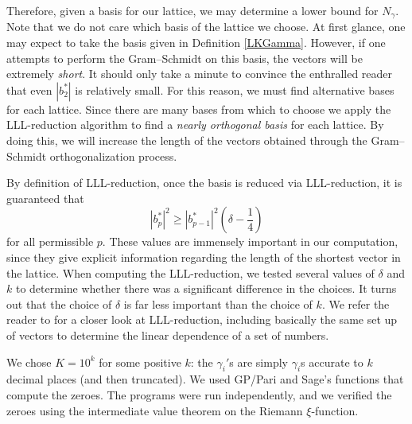 \documentclass{article}
\numberwithin{equation}{section}
\begin{document}
Therefore, given a basis for our lattice, we may determine a lower bound for  $N_{\gamma}$. Note that we do not care which basis of the lattice we choose. At first glance, one may expect to take the basis given in Definition \ref{LKGamma}. However, if one attempts to perform the Gram--Schmidt on this basis, the vectors will be extremely {\it short}. It should only take a minute to convince the enthralled reader that even $|b_2^*|$ is relatively small. For this reason, we must find alternative bases for each lattice. Since there are many bases from which to choose we apply the LLL-reduction algorithm to find a {\it nearly orthogonal basis} for each lattice. By doing this, we will increase the length of the vectors obtained through the Gram--Schmidt orthogonalization process.

By definition of LLL-reduction, once the basis is reduced via LLL-reduction, it is guaranteed that $$|b_p^*|^2 \geq |b_{p-1}^*|^2\left(\delta-\frac14\right)$$ for all permissible $p$. These values are immensely important in our computation, since they give explicit information regarding the length of the shortest vector in the lattice. When computing the LLL-reduction, we tested several values of $\delta$ and $k$ to determine whether there was a significant difference in the choices. It turns out that the choice of $\delta$ is far less important than the choice of $k$. We refer the reader to \cite[Ch. 2]{computational-num-theory} for a closer look at LLL-reduction, including basically the same set up of vectors to determine the linear dependence of a set of numbers.

We chose $K = 10^k$ for some positive $k$: the $\gamma_i'$s are simply $\gamma_i$s accurate to $k$ decimal places (and then truncated). We used GP/Pari and Sage's functions that compute the zeroes. The programs were run independently, and we verified the zeroes using the intermediate value theorem on the Riemann $\xi$-function.
\end{document}
